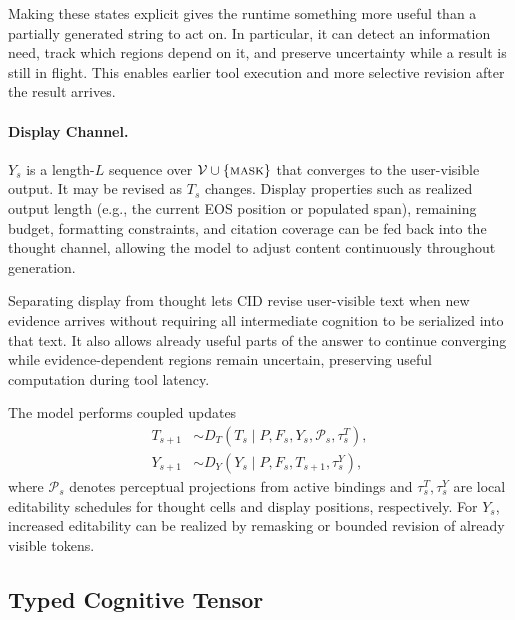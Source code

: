 Making these states explicit gives the runtime something more useful than a partially generated string to act on. In particular, it can detect an information need, track which regions depend on it, and preserve uncertainty while a result is still in flight. This enables earlier tool execution and more selective revision after the result arrives.

\paragraph{Display Channel.}
$Y_s$ is a length-$L$ sequence over $\mathcal{V}\cup\{\textsc{mask}\}$ that converges to the user-visible output. It may be revised as $T_s$ changes. Display properties such as realized output length (e.g., the current EOS position or populated span), remaining budget, formatting constraints, and citation coverage can be fed back into the thought channel, allowing the model to adjust content continuously throughout generation.

Separating display from thought lets CID revise user-visible text when new evidence arrives without requiring all intermediate cognition to be serialized into that text. It also allows already useful parts of the answer to continue converging while evidence-dependent regions remain uncertain, preserving useful computation during tool latency.

The model performs coupled updates
\begin{align}
  T_{s+1} &\sim D_T(T_s \mid P, F_s, Y_s, \mathcal{P}_s, \tau^T_s), \\
  Y_{s+1} &\sim D_Y(Y_s \mid P, F_s, T_{s+1}, \tau^Y_s),
  \label{eq:coupled-denoise}
\end{align}
where $\mathcal{P}_s$ denotes perceptual projections from active bindings and $\tau^T_s,\tau^Y_s$ are local editability schedules for thought cells and display positions, respectively. For $Y_s$, increased editability can be realized by remasking or bounded revision of already visible tokens.

\subsection{Typed Cognitive Tensor}
\label{sec:tct}

